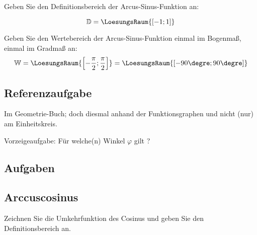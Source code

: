 Geben Sie den Definitionsbereich der Arcus-Sinus-Funktion an:

$$\mathbb{D} = \LoesungsRaum{\left[-1; 1\right]}$$

Geben Sie den Wertebereich der Arcus-Sinus-Funktion einmal im Bogenmaß,
einmal im Gradmaß an:
$$\mathbb{W} = \LoesungsRaum{\left[-\frac{\pi}{2}; \frac{\pi}{2}\right]}  =  \LoesungsRaum{[-90\degre; 90\degre]}$$
\newpage


\subsection*{Referenzaufgabe}

Im Geometrie-Buch; doch diesmal anhand der Funktionsgraphen und nicht (nur) am Einheitskreis.

Vorzeigeaufgabe: Für welche(n) Winkel $\varphi$ gilt \fbox{$\sin(\varphi) = -\sin(-41.7\degre)$}?


\trigsysDsin{}

\subsection*{Aufgaben}


\TNTeop{}

\subsection{Arccuscosinus}
Zeichnen Sie die Umkehrfunktion des Cosinus und geben Sie den Definitionsbereich an.




